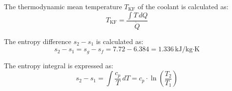 The thermodynamic mean temperature \( T_{\text{KF}} \) of the coolant is calculated as:  
\[
T_{\text{KF}} = \frac{\int T \, dQ}{\dot{Q}}
\]  

The entropy difference \( s_2 - s_1 \) is calculated as:  
\[
s_2 - s_1 = s_g - s_f = 7.72 - 6.384 = 1.336 \, \text{kJ/kg·K}
\]  

The entropy integral is expressed as:  
\[
s_2 - s_1 = \int \frac{c_p}{T} \, dT = c_p \cdot \ln \left( \frac{T_2}{T_1} \right)
\]